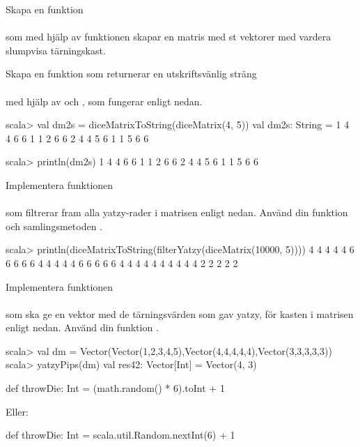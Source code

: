 \Subtask Skapa en funktion  \\  \\ som med hjälp av funktionen  skapar en matris med  st vektorer med vardera  slumpvisa tärningskast.


\Subtask \label{matrices:subtask:diceMatrixToString} Skapa en funktion som returnerar en utskriftsvänlig sträng \\  \\med hjälp av  och , som fungerar enligt nedan.
\begin{REPL}
scala> val dm2s = diceMatrixToString(diceMatrix(4, 5))
val dm2s: String = 1 4 4 6 6
1 1 2 6 6
2 4 4 5 6
1 1 5 6 6

scala> println(dm2s)
1 4 4 6 6
1 1 2 6 6
2 4 4 5 6
1 1 5 6 6
\end{REPL}



\Subtask Implementera funktionen \\  \\ som filtrerar fram alla yatzy-rader i matrisen  enligt nedan. Använd din funktion  och samlingsmetoden .
\begin{REPL}
scala> println(diceMatrixToString(filterYatzy(diceMatrix(10000, 5))))
4 4 4 4 4
6 6 6 6 6
4 4 4 4 4
6 6 6 6 6
4 4 4 4 4
4 4 4 4 4
2 2 2 2 2
\end{REPL}



\Subtask Implementera funktionen \\
\\
som ska ge en vektor med de tärningsvärden som gav yatzy, för kasten i matrisen  enligt nedan. Använd din funktion .
\begin{REPL}
scala> val dm = Vector(Vector(1,2,3,4,5),Vector(4,4,4,4,4),Vector(3,3,3,3,3))
scala> yatzyPips(dm)
val res42: Vector[Int] = Vector(4, 3)
\end{REPL}

\SOLUTION

\TaskSolved \what

\SubtaskSolved
\begin{Code}
def throwDie: Int = (math.random() * 6).toInt + 1
\end{Code}
Eller:
\begin{Code}
def throwDie: Int = scala.util.Random.nextInt(6) + 1
\end{Code}

